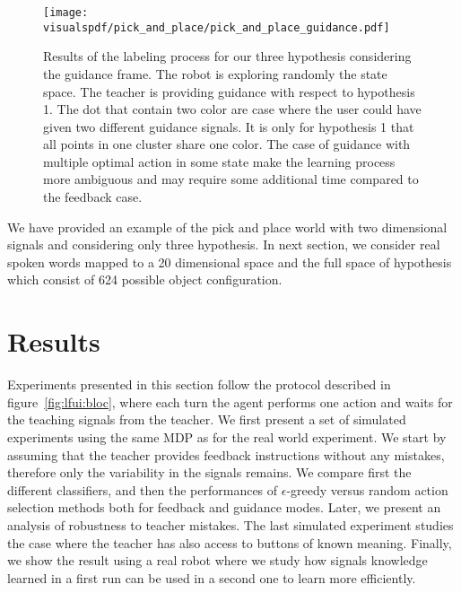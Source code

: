 \begin{figure}[!ht]
  \centering
  \texttt{[image: \\visualspdf/pick\_and\_place/pick\_and\_place\_guidance.pdf]}
  \caption{Results of the labeling process for our three hypothesis considering the guidance frame. The robot is exploring randomly the state space. The teacher is providing guidance with respect to hypothesis 1. The dot that contain two color are case where the user could have given two different guidance signals. It is only for hypothesis 1 that all points in one cluster share one color. The case of guidance with multiple optimal action in some state make the learning process more ambiguous and may require some additional time compared to the feedback case.}
  \label{fig:lfui:pickplaceguidance}
\end{figure}

We have provided an example of the pick and place world with two dimensional signals and considering only three hypothesis. In next section, we consider real spoken words mapped to a 20 dimensional space and the full space of hypothesis which consist of 624 possible object configuration.

\section{Results}

Experiments presented in this section follow the protocol described in figure~\ref{fig:lfui:bloc}, where each turn the agent performs one action and waits for the teaching signals from the teacher. We first present a set of simulated experiments using the same MDP as for the real world experiment. We start by assuming that the teacher provides feedback instructions without any mistakes, therefore only the variability in the signals remains. We compare first the different classifiers, and then the performances of $\epsilon$-greedy versus random action selection methods both for feedback and guidance modes. Later, we present an analysis of robustness to teacher mistakes. The last simulated experiment studies the case where the teacher has also access to buttons of known meaning. Finally, we show the result using a real robot where we study how signals knowledge learned in a first run can be used in a second one to learn more efficiently.

